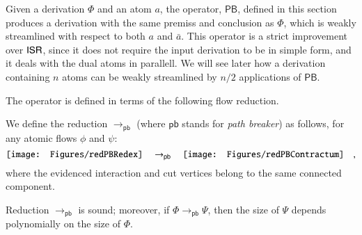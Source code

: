 \newcommand{\PB}{\mathsf{PB}}


Given a derivation $\Phi$ and an atom $a$, the operator, $\PB$, defined in this section produces a derivation with the same premiss and conclusion as $\Phi$, which is weakly streamlined with respect to both $a$ and $\bar a$. This operator is a strict improvement over $\mathsf{ISR}$, since it does not require the input derivation to be in simple form, and it deals with the dual atoms in parallell. We will see later how a derivation containing $n$ atoms can be weakly streamlined by $n/2$ applications of $\PB$.

The operator is defined in terms of the following flow reduction.


\newcommand{\frpb}{{\mathsf{pb}}}
\begin{definition}\label{definition:PathBreaker}
We define the reduction $\to_\frpb$ (where $\frpb$ stands for \emph{path breaker}) as follows, for any atomic flows $\phi$ and $\psi$:
\[
\vcenter{\hbox{\texttt{[image: Figures/redPBRedex]}}}
\quad\to_\frpb\quad
\vcenter{\hbox{\texttt{[image: Figures/redPBContractum]}}}
\quad,
\]
where the evidenced interaction and cut vertices belong to the same connected component.
\end{definition}

\begin{theorem}\label{theorem:SoundPathBreaker}
Reduction $\to_\frpb$ is sound; moreover, if\/ $\Phi\to_\frpb\Psi$, then the size of $\Psi$ depends polynomially on the size of $\Phi$.
\end{theorem}

